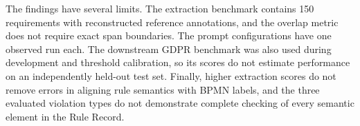 The findings have several limits. The extraction benchmark contains 150
requirements with reconstructed reference annotations, and the overlap metric
does not require exact span boundaries. The prompt configurations have one
observed run each. The downstream GDPR benchmark was also used during
development and threshold calibration, so its scores do not estimate
performance on an independently held-out test set. Finally, higher extraction
scores do not remove errors in aligning rule semantics with BPMN labels, and
the three evaluated violation types do not demonstrate complete checking of
every semantic element in the Rule Record.
